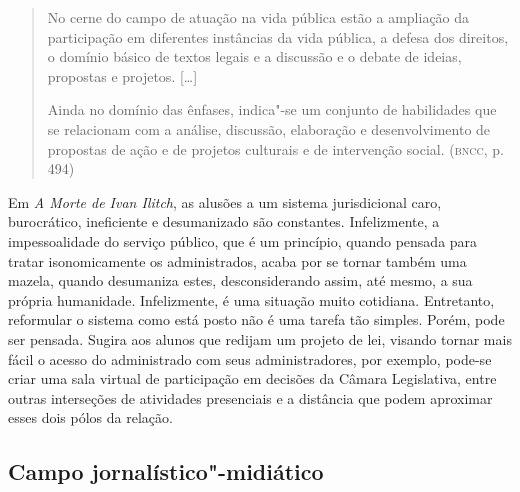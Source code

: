 \documentclass[12pt]{extarticle}
\begin{document}
\begin{quote}
No cerne do campo de atuação na vida pública estão a ampliação da
participação em diferentes instâncias da vida pública, a defesa dos
direitos, o domínio básico de textos legais e a discussão e o debate de
ideias, propostas e projetos. {[}\ldots{}{]}

Ainda no domínio das ênfases, indica"-se um conjunto de habilidades que
se relacionam com a análise, discussão, elaboração e desenvolvimento de
propostas de ação e de projetos culturais e de intervenção social.
(\textsc{bncc}, p. 494)
\end{quote}

Em \emph{A Morte de Ivan Ilitch}, as alusões a um sistema
jurisdicional caro, burocrático, ineficiente e desumanizado são
constantes. Infelizmente, a impessoalidade do serviço público, que é
um princípio, quando pensada para tratar isonomicamente os
administrados, acaba por se tornar também uma mazela, quando
desumaniza estes, desconsiderando assim, até mesmo, a sua própria
humanidade. Infelizmente, é uma situação muito cotidiana. Entretanto,
reformular o sistema como está posto não é uma tarefa tão simples.
Porém, pode ser pensada. Sugira aos alunos que redijam um projeto de
lei, visando tornar mais fácil o acesso do administrado com seus
administradores, por exemplo, pode-se criar uma sala virtual de
participação em decisões da Câmara Legislativa, entre outras
interseções de atividades presenciais e a distância que podem
aproximar esses dois pólos da relação.

\subsection{Campo jornalístico"-midiático}
\end{document}

